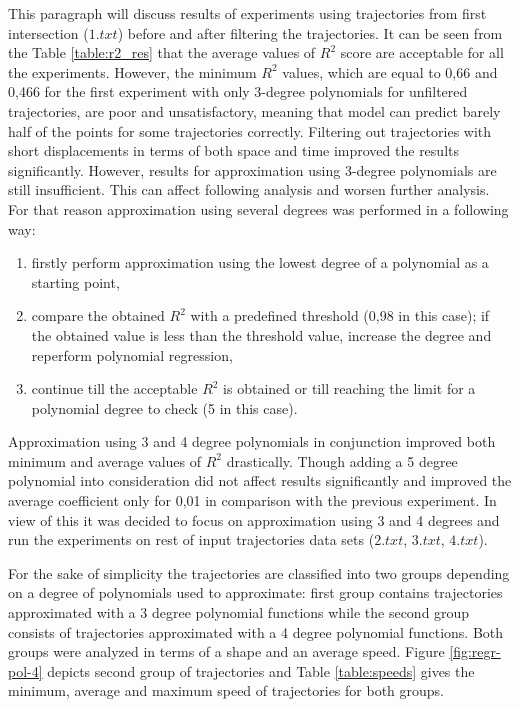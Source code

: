 This paragraph will discuss results of experiments using trajectories from first intersection ($1.txt$) before and after filtering the trajectories. It can be seen from the Table \ref{table:r2_res} that the average values of $R^2$ score are acceptable for all the experiments. However, the minimum $R^2$ values, which are equal to 0,66 and 0,466 for the first experiment with only 3-degree polynomials for unfiltered trajectories, are poor and unsatisfactory, meaning that model can predict barely half of the points for some trajectories correctly. Filtering out trajectories with short displacements in terms of both space and time improved the results significantly. However, results for approximation using 3-degree polynomials are still insufficient. This can affect following analysis and worsen further analysis. For that reason approximation using several degrees was performed in a following way:

\begin{enumerate}
	\setlength\itemsep{0em}
	\item firstly perform approximation using the lowest degree of a polynomial as a starting point,
	\item compare the obtained $R^2$ with a predefined threshold (0,98 in this case); if the obtained value is less than the threshold value, increase the degree and reperform polynomial regression,
	\item continue till the acceptable $R^2$ is obtained or till reaching the limit for a polynomial degree to check (5 in this case). 
\end{enumerate} 

Approximation using 3 and 4 degree polynomials in conjunction improved both minimum and average values of $R^2$ drastically. Though adding a 5 degree polynomial into consideration did not affect results significantly and improved the average coefficient only for 0,01 in comparison with the previous experiment. In view of this it was decided to focus on approximation using 3 and 4 degrees and run the experiments on rest of input trajectories data sets ($2.txt$, $3.txt$, $4.txt$).

For the sake of simplicity the trajectories are classified into two groups depending on a degree of polynomials used to approximate: first group contains trajectories approximated with a 3 degree polynomial functions while the second group consists of trajectories approximated with a 4 degree polynomial functions. Both groups were analyzed in terms of a shape and an average speed. Figure \ref{fig:regr-pol-4} depicts second group of trajectories and Table \ref{table:speeds} gives the minimum, average and maximum speed of trajectories for both groups.

